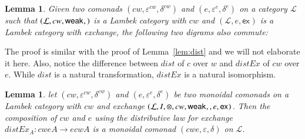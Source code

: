 \documentclass{article}
\newtheorem{lemma}[theorem]{Lemma}
\let\mto\to
\let\to\relax
\newcommand{\to}{\rightarrow}
\let\c\relax
\newcommand{\cat}[1]{\mathcal{#1}}
\newcommand{\w}[1]{\mathsf{weak}_{#1}}
\newcommand{\c}[1]{\mathsf{contra}_{#1}}
\newcommand{\e}[1]{\mathsf{ex}_{#1}}
\begin{document}
\begin{lemma}
  \label{lem:distEx}
  Given two comonads $(cw,\varepsilon^{cw},\delta^{cw})$ and
  $(e,\varepsilon^e,\delta^e)$ on a category $\cat{L}$ such that
  $(\cat{L},cw,\w{},\c{})$ is a Lambek category with $cw$ and
  $(\cat{L},e,\e{})$ is a Lambek category with exchange, the following
  two digrams also commute:
\end{lemma}

  The proof is similar with the proof of Lemma~\ref{lem:dist} and we will
  not elaborate it here. Also, notice the difference between $dist$ of $c$
  over $w$ and $distEx$ of $cw$ over $e$. While $dist$ is a natural
  transformation, $distEx$ is a natural isomorphism.


\begin{lemma}
  \label{lem:compose-cwe}
  let $(cw,\varepsilon^{cw},\delta^{cw})$ and $(e,\varepsilon^e,\delta^e)$
  be two monoidal comonads on a Lambek category with $cw$ and exchange
  $(\cat{L},I,\otimes,cw,\w{},\c{},e,\e{})$. Then the composition of $cw$
  and $e$ using the distributive law for exchange $distEx_A:cweA\mto ecwA$
  is a monoidal comonad $(cwe,\varepsilon,\delta)$ on $\cat{L}$.
\end{lemma}
\end{document}
